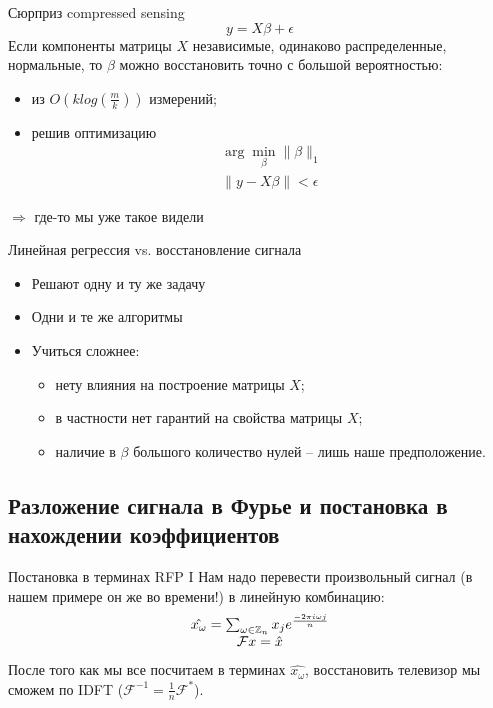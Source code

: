 \documentclass[14pt, fleqn, xcolor={dvipsnames, table}]{beamer}
\begin{document}
\begin{frame}{Сюрприз compressed sensing}
\small
$$
y = X\beta + \epsilon
$$
Если компоненты матрицы $X$ независимые, одинаково распределенные, нормальные, то $\beta$ можно восстановить точно с большой вероятностью:
\begin{itemize}
  \item из $O(k log(\frac{m}{k}))$ измерений;
  \item решив оптимизацию
    $$\begin{array}{l}
    \arg \min_\beta\|\beta\|_1\\
    \|y - X\beta\| < \epsilon
    \end{array}$$
\end{itemize}
$\Rightarrow$ где-то мы уже такое видели
\end{frame}

\begin{frame}{Линейная регрессия vs. восстановление сигнала}
\begin{itemize}
  \item Решают одну и ту же задачу
  \item Одни и те же алгоритмы
  \item Учиться сложнее:
  \begin{itemize}
    \item нету влияния на построение матрицы $X$;
    \item в частности нет гарантий на свойства матрицы $X$;
    \item наличие в $\beta$ большого количество нулей -- лишь наше предположение.
  \end{itemize}
\end{itemize}
\end{frame}

\subsection{Разложение сигнала в Фурье и постановка в нахождении коэффициентов}
\begin{frame}{Постановка в терминах RFP I}
Нам надо перевести произвольный сигнал (в нашем примере он же во времени!) в линейную комбинацию:
$$\begin{array}{c}
\hat{x_\omega} = \sum_{\omega \in \mathbb{Z}_n} x_j e^{-2\pi i \omega j \over n} \\
\mathcal{F}x = \hat{x}
\end{array}$$
После того как мы все посчитаем в терминах $\hat{x_\omega}$, восстановить телевизор мы сможем по IDFT ($\mathcal{F}^{-1}=\frac{1}{n}\mathcal{F^*}$).
\end{frame}
\end{document}

